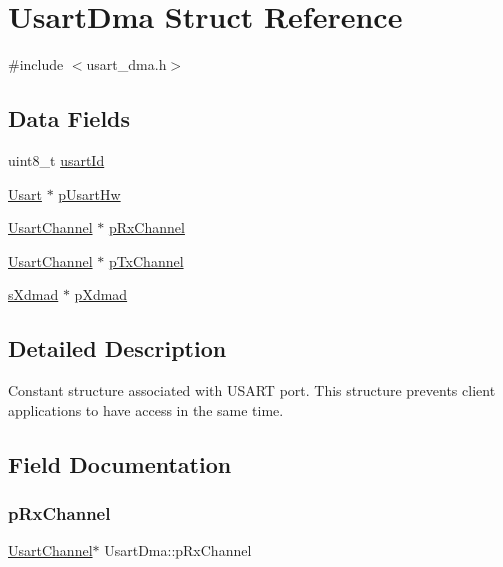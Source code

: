 \hypertarget{structUsartDma}{}\section{Usart\+Dma Struct Reference}
\label{structUsartDma}


{\ttfamily \#include $<$usart\+\_\+dma.\+h$>$}

\subsection*{Data Fields}
\begin{DoxyCompactItemize}
\item 
uint8\+\_\+t \mbox{\hyperlink{structUsartDma_ac4d16295a0ccb49eab67e78c1cdfc9c7}{usart\+Id}}
\item 
\mbox{\hyperlink{structUsart}{Usart}} $\ast$ \mbox{\hyperlink{structUsartDma_a594f2023773095105867ab77cd0d046d}{p\+Usart\+Hw}}
\item 
\mbox{\hyperlink{structUsartChannel}{Usart\+Channel}} $\ast$ \mbox{\hyperlink{structUsartDma_a2921e8c315edf6296078391e37900f0b}{p\+Rx\+Channel}}
\item 
\mbox{\hyperlink{structUsartChannel}{Usart\+Channel}} $\ast$ \mbox{\hyperlink{structUsartDma_aca29d09987b0d6cc696588dc695e4341}{p\+Tx\+Channel}}
\item 
\mbox{\hyperlink{group__dmad__structs_gaf2c13151514615a6beb35c0d868a5053}{s\+Xdmad}} $\ast$ \mbox{\hyperlink{structUsartDma_a3b74d3a1b9ea6516dc1db7f01e57f320}{p\+Xdmad}}
\end{DoxyCompactItemize}


\subsection{Detailed Description}
Constant structure associated with U\+S\+A\+RT port. This structure prevents client applications to have access in the same time. 

\subsection{Field Documentation}
\mbox{\label{structUsartDma_a2921e8c315edf6296078391e37900f0b}} 
\subsubsection{\texorpdfstring{pRxChannel}{pRxChannel}}
{\footnotesize\ttfamily \mbox{\hyperlink{structUsartChannel}{Usart\+Channel}}$\ast$ Usart\+Dma\+::p\+Rx\+Channel}

